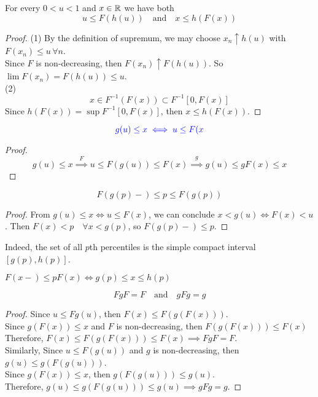 \documentclass[11pt]{article}
\numberwithin{equation}{section}
\begin{document}
\proposition For every $0<u<1$ and $x \in \mathbb{R}$ we have both
\begin{equation}
	u \leq F(h(u)) \quad \text{and} \quad x \leq h(F(x))
\end{equation}
\begin{proof}
	(1) By the definition of supremum, we may choose $x_n \uparrow h(u)$ with $F(x_n) \leq u \, \forall n$. \\
	Since $F$ is non-decreasing, then $F(x_n) \uparrow F(h(u))$. So $\lim F(x_n) = F(h(u)) \leq u$.\\
	(2) $$x \in F^{-1}(F(x)) \subset F^{-1}[0, F(x)]$$
	Since $h(F(x)) = \sup F^{-1}[0, F(x)]$, then $x \leq h(F(x))$.
\end{proof}

\corollary \label{quantile iff} \begin{equation}\textcolor{blue}{g(u) \leq x \iff u \leq F(x}\end{equation}
\begin{proof}
	$$g(u) \leq x \overset{F}{\implies} u \leq F(g(u)) \leq F(x) \overset{g}{\implies} g(u) \leq g F(x) \leq x$$
\end{proof}

\corollary 
\begin{equation}
	F(g(p)-) \leq p \leq F(g(p))
\end{equation}
\begin{proof}
	From $g(u) \leq x \iff u \leq F(x)$, we can conclude $x < g(u) \iff F(x) < u$.
	Then $F(x) < p \quad \forall x < g(p)$, so $F(g(p)-) \leq p$.
\end{proof}

\remark
Indeed, the set of all $p$th percentiles is the simple compact interval $[g(p), h(p)]$.

\corollary $F(x-) \leq p F(x) \iff g(p) \leq x \leq h(p)$

\corollary $$FgF = F\quad \text{and} \quad gFg = g$$
\begin{proof}
	Since $u \leq Fg(u)$, then $F(x) \leq F(g(F(x)))$. \\
	Since $g(F(x)) \leq x$ and $F$ is non-decreasing, then $F(g(F(x))) \leq F(x)$ \\
	Therefore, $F(x) \leq F(g(F(x))) \leq F(x) \implies FgF = F$.\\
	Similarly, Since $u \leq F(g(u))$ and $g$ is non-decreasing, then $g(u) \leq g(F(g(u)))$.\\
	Since $g(F(x)) \leq x$, then $g(F(g(u))) \leq g(u)$.\\
	Therefore, $g(u) \leq g(F(g(u))) \leq g(u) \implies gFg = g$.
\end{proof}
\end{document}
